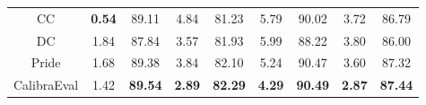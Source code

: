 \documentclass[sigconf]{acmart}
\begin{document}
\begin{table}[t]
\begin{tabular}{c|cc|cc|cc|cc}
CC                     & \textbf{0.54}   & 89.11          & 4.84          & 81.23          & 5.79              & 90.02             & 3.72          & 86.79          \\
DC                     & 1.84            & 87.84          & 3.57          & 81.93          & 5.99              & 88.22             & 3.80          & 86.00          \\
Pride                  & 1.68            & 89.38          & 3.84          & 82.10          & 5.24              & 90.47             & 3.60          & 87.32          \\
CalibraEval            & 1.42            & \textbf{89.54} & \textbf{2.89} & \textbf{82.29} & \textbf{4.29}     & \textbf{90.49}    & \textbf{2.87} & \textbf{87.44} \\ \hline
\end{tabular}
\label{refer-metric}
\end{table}
\end{document}
